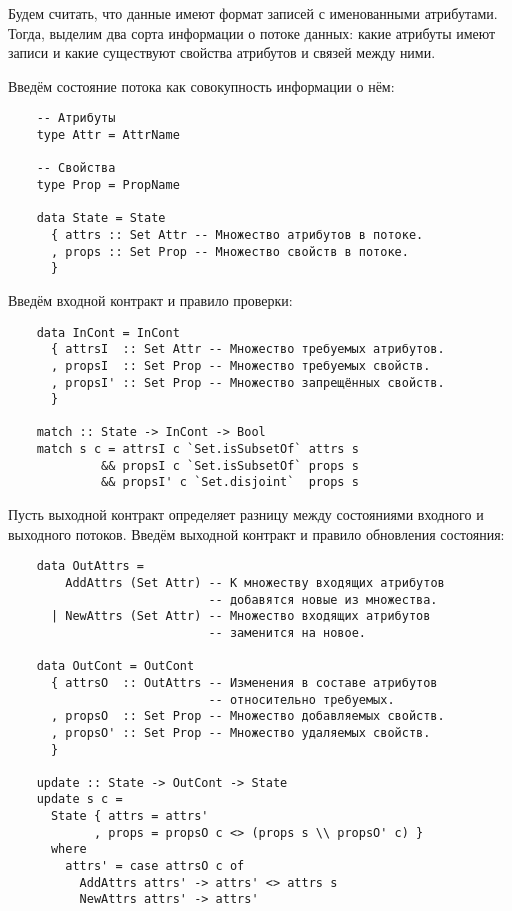 Будем считать, что данные имеют формат записей с именованными атрибутами.
Тогда, выделим два сорта информации о потоке данных: какие атрибуты имеют записи и какие существуют свойства атрибутов и связей между ними.

Введём состояние потока как совокупность информации о нём:
\begin{lstlisting}
    -- Атрибуты
    type Attr = AttrName

    -- Свойства
    type Prop = PropName

    data State = State
      { attrs :: Set Attr -- Множество атрибутов в потоке.
      , props :: Set Prop -- Множество свойств в потоке.
      }
\end{lstlisting}

Введём входной контракт и правило проверки:
\begin{lstlisting}
    data InCont = InCont
      { attrsI  :: Set Attr -- Множество требуемых атрибутов.
      , propsI  :: Set Prop -- Множество требуемых свойств.
      , propsI' :: Set Prop -- Множество запрещённых свойств.
      }

    match :: State -> InCont -> Bool
    match s c = attrsI c `Set.isSubsetOf` attrs s
             && propsI c `Set.isSubsetOf` props s
             && propsI' c `Set.disjoint`  props s
\end{lstlisting}

Пусть выходной контракт определяет разницу между состояниями входного и выходного потоков. Введём выходной контракт и правило обновления состояния:

\begin{lstlisting}
    data OutAttrs =
        AddAttrs (Set Attr) -- К множеству входящих атрибутов
                            -- добавятся новые из множества.
      | NewAttrs (Set Attr) -- Множество входящих атрибутов
                            -- заменится на новое.

    data OutCont = OutCont
      { attrsO  :: OutAttrs -- Изменения в составе атрибутов
                            -- относительно требуемых.
      , propsO  :: Set Prop -- Множество добавляемых свойств.
      , propsO' :: Set Prop -- Множество удаляемых свойств.
      }

    update :: State -> OutCont -> State
    update s c =
      State { attrs = attrs'
            , props = propsO c <> (props s \\ propsO' c) }
      where
        attrs' = case attrsO c of
          AddAttrs attrs' -> attrs' <> attrs s
          NewAttrs attrs' -> attrs'
\end{lstlisting}

